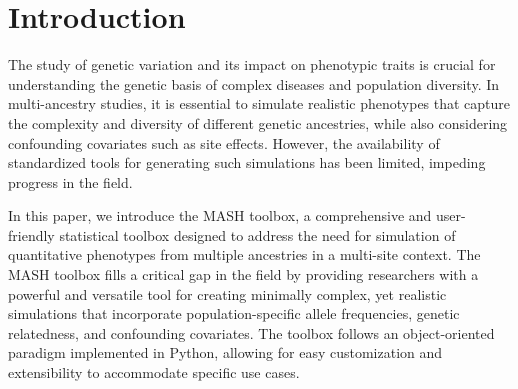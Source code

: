 \documentclass[sn-nature]{sn-jnl}%
\begin{document}
\maketitle


\section{Introduction}\label{sec:intro}
The study of genetic variation and its impact on phenotypic traits is crucial for understanding the genetic basis of complex diseases and population diversity. In multi-ancestry studies, it is essential to simulate realistic phenotypes that capture the complexity and diversity of different genetic ancestries, while also considering confounding covariates such as site effects. However, the availability of standardized tools for generating such simulations has been limited, impeding progress in the field.

In this paper, we introduce the MASH toolbox, a comprehensive and user-friendly statistical toolbox designed to address the need for simulation of quantitative phenotypes from multiple ancestries in a multi-site context. The MASH toolbox fills a critical gap in the field by providing researchers with a powerful and versatile tool for creating minimally complex, yet realistic simulations that incorporate population-specific allele frequencies, genetic relatedness, and confounding covariates. The toolbox follows an object-oriented paradigm implemented in Python, allowing for easy customization and extensibility to accommodate specific use cases.
\end{document}
